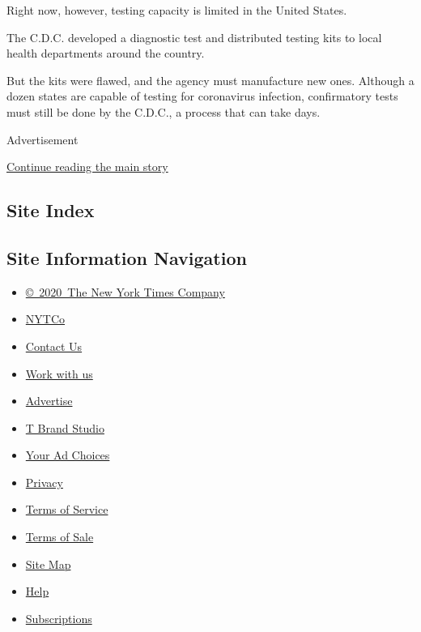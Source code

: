 Right now, however, testing capacity is limited in the United States.

The C.D.C. developed a diagnostic test and distributed testing kits to
local health departments around the country.

But the kits were flawed, and the agency must manufacture new ones.
Although a dozen states are capable of testing for coronavirus
infection, confirmatory tests must still be done by the C.D.C., a
process that can take days.

Advertisement

\protect\hyperlink{after-bottom}{Continue reading the main story}

\hypertarget{site-index}{%
\subsection{Site Index}\label{site-index}}

\hypertarget{site-information-navigation}{%
\subsection{Site Information
Navigation}\label{site-information-navigation}}

\begin{itemize}
\tightlist
\item
  \href{https://help.nytimes.com/hc/en-us/articles/115014792127-Copyright-notice}{©~2020~The
  New York Times Company}
\end{itemize}

\begin{itemize}
\tightlist
\item
  \href{https://www.nytco.com/}{NYTCo}
\item
  \href{https://help.nytimes.com/hc/en-us/articles/115015385887-Contact-Us}{Contact
  Us}
\item
  \href{https://www.nytco.com/careers/}{Work with us}
\item
  \href{https://nytmediakit.com/}{Advertise}
\item
  \href{http://www.tbrandstudio.com/}{T Brand Studio}
\item
  \href{https://www.nytimes.com/privacy/cookie-policy\#how-do-i-manage-trackers}{Your
  Ad Choices}
\item
  \href{https://www.nytimes.com/privacy}{Privacy}
\item
  \href{https://help.nytimes.com/hc/en-us/articles/115014893428-Terms-of-service}{Terms
  of Service}
\item
  \href{https://help.nytimes.com/hc/en-us/articles/115014893968-Terms-of-sale}{Terms
  of Sale}
\item
  \href{https://spiderbites.nytimes.com}{Site Map}
\item
  \href{https://help.nytimes.com/hc/en-us}{Help}
\item
  \href{https://www.nytimes.com/subscription?campaignId=37WXW}{Subscriptions}
\end{itemize}
